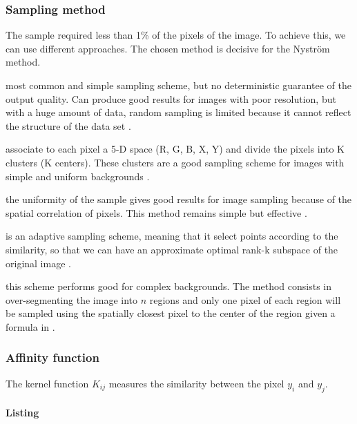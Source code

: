 \documentclass[]{article}
\begin{document}
\subsubsection{Sampling method}
The sample required less than 1\% of the pixels of the image. To achieve this, we can use different approaches. The chosen method is decisive for the Nystr\"om method.
\begin{description}[align=left]
 \item [Random sampling (RS)] most common and simple sampling scheme, but no deterministic guarantee of the output quality. Can produce good results for images with poor resolution, but with a huge amount of data, random sampling is limited because it cannot reflect the structure of the data set \cite{zhan_improved_2017}.
 \item [K-means sampling (KS)] associate to each pixel a 5-D space (R, G, B, X, Y) and divide the pixels into K clusters (K centers). These clusters are a good sampling scheme for images with simple and uniform backgrounds \cite{kao_sampling_2012} \cite{zhang_improved_2008}.
 \item [Uniform spatially sampling] the uniformity of the sample gives good results for image sampling because of the spatial correlation of pixels. This method remains simple but effective \cite{glide_2014}.
 \item [Incremental sampling (INS)] is an adaptive sampling scheme, meaning that it select points according to the similarity, so that we can have an approximate optimal rank-k subspace of the original image \cite{zhan_improved_2017}.
 \item [Mean-shift segmentation-based sampling] this scheme performs good for complex backgrounds. The method consists in over-segmenting the image into \(n\) regions and only one pixel of each region will be sampled using the spatially closest pixel to the center of the region given a formula in \cite{kao_sampling_2012}.
\end{description}

\subsubsection{Affinity function}
The kernel function \(K_{ij}\) measures the similarity between the pixel \(y_i\) and \(y_j\).

\paragraph{Listing}
\end{document}
